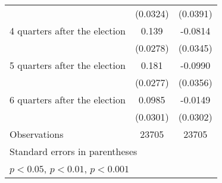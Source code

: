 \begin{table}[htbp]
\begin{tabular}{l*{2}{c}}
                    &    (0.0324)         &    (0.0391)         \\
[1em]
 4 quarters after the election&       0.139\sym{***}&     -0.0814\sym{*}  \\
                    &    (0.0278)         &    (0.0345)         \\
[1em]
 5 quarters after the election&       0.181\sym{***}&     -0.0990\sym{**} \\
                    &    (0.0277)         &    (0.0356)         \\
[1em]
 6 quarters after the election&      0.0985\sym{**} &     -0.0149         \\
                    &    (0.0301)         &    (0.0302)         \\
\hline
Observations        &       23705         &       23705         \\
\hline\hline
\multicolumn{3}{l}{\footnotesize Standard errors in parentheses}\\
\multicolumn{3}{l}{\footnotesize \sym{*} \(p<0.05\), \sym{**} \(p<0.01\), \sym{***} \(p<0.001\)}\\
\end{tabular}
\end{table}
